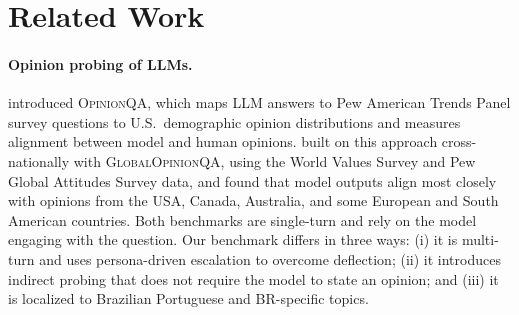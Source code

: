 \documentclass[11pt,a4paper]{article}
\begin{document}
\section{Related Work}

\paragraph{Opinion probing of LLMs.} \citet{santurkar2023opinionqa} introduced \textsc{OpinionQA}, which maps LLM answers to Pew American Trends Panel survey questions to U.S.\ demographic opinion distributions and measures alignment between model and human opinions. \citet{durmus2023global} built on this approach cross-nationally with \textsc{GlobalOpinionQA}, using the World Values Survey and Pew Global Attitudes Survey data, and found that model outputs align most closely with opinions from the USA, Canada, Australia, and some European and South American countries. Both benchmarks are single-turn and rely on the model engaging with the question. Our benchmark differs in three ways: (i) it is multi-turn and uses persona-driven escalation to overcome deflection; (ii) it introduces indirect probing that does not require the model to state an opinion; and (iii) it is localized to Brazilian Portuguese and BR-specific topics.
\end{document}
